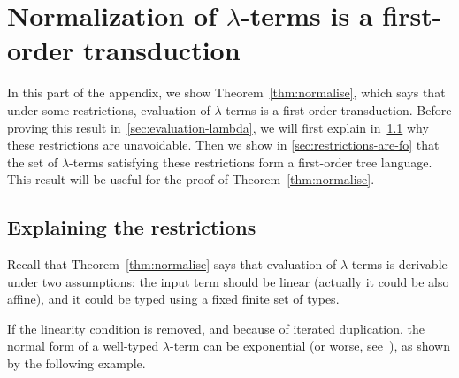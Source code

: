 \section{Normalization of $\lambda$-terms is a first-order transduction}
\label{sec:eval}

\newcommand{\lambdaterm}{$\lambda$-term }
\newcommand{\lambdaterms}{$\lambda$-terms }

\newcommand{\NonLinTerms}[2]{\Lambda_{#1} #2}
\newcommand{\LinTerms}[2]{\mathsf{Lin}_{#1} #2}

 \newcommand{\rlambda}{\ranked{\Lambda}}
 \newcommand{\rlambdalin}{\ranked{\Lambda^{\sf{lin}}}}
 \newcommand{\rlambdathin}{\ranked{\Lambda^{\sf{thin}}}}


\newcommand{\thinterm}[1]{\ranked{\mathsf{Thin}_{#1}}}

In this part of the appendix, we show Theorem~\ref{thm:normalise}, which says that under some restrictions, evaluation of $\lambda$-terms is a first-order transduction. Before proving this result in~\ref{sec:evaluation-lambda}, we will first explain in~\ref{sec:explaining-restrictions} why these restrictions are unavoidable. Then we show in \ref{sec:restrictions-are-fo} that the set of $\lambda$-terms satisfying these restrictions form a first-order tree language. This result will be useful for the proof of Theorem~\ref{thm:normalise}.



\subsection{Explaining the restrictions}\label{sec:explaining-restrictions}

Recall that Theorem~\ref{thm:normalise} says that evaluation of $\lambda$-terms is derivable under two assumptions:
the input term should be linear (actually it could be also affine),  and it could be typed using a fixed finite set of types. 

If the linearity condition is removed, and because of iterated duplication, the normal form of a well-typed $\lambda$-term can be exponential (or worse, see~\cite[Section 3.6]{sorensen_lectures_2006}), as shown by the following example.
 

